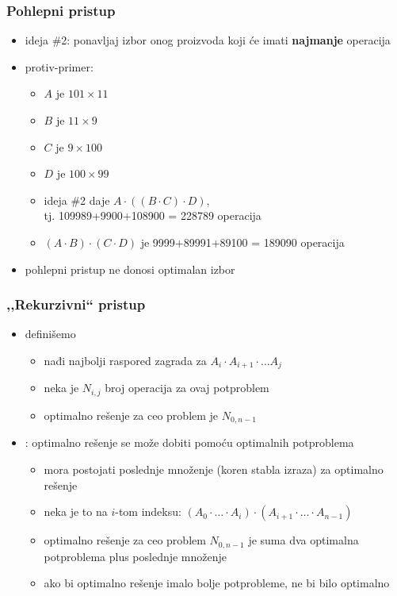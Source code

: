 \documentclass[compress]{beamer}
\begin{document}
\begin{frame}[fragile]
  \frametitle{Pohlepni pristup}
  \begin{itemize}
    \item ideja \#2: ponavljaj izbor onog proizvoda koji će imati \textbf{najmanje} operacija
    \item protiv-primer:
    \begin{itemize}
      \item $A$ je $101\times 11$
      \item $B$ je $11\times 9$
      \item $C$ je $9\times 100$
      \item $D$ je $100\times 99$
      \item ideja \#2 daje $A\cdot ((B\cdot C)\cdot D)$, \\ tj. 109989+9900+108900 = 228789 operacija
      \item $(A\cdot B)\cdot (C\cdot D)$ je 9999+89991+89100 = 189090 operacija
    \end{itemize}
    \item pohlepni pristup ne donosi optimalan izbor
  \end{itemize}
\end{frame}

\begin{frame}[fragile]
  \frametitle{,,Rekurzivni`` pristup}
  \begin{itemize}
    \item definišemo 
    \begin{itemize}
      \item nađi najbolji raspored zagrada za $A_{i}\cdot A_{i+1}\cdot \ldots A_{j}$
      \item neka je $N_{i,j}$ broj operacija za ovaj potproblem
      \item optimalno rešenje za ceo problem je $N_{0,n-1}$
    \end{itemize}
    \item {}: optimalno rešenje se može 
    dobiti pomoću optimalnih potproblema
    \begin{itemize}
      \item mora postojati poslednje množenje (koren stabla izraza) za 
      optimalno rešenje
      \item neka je to na $i$-tom indeksu: $(A_{0}\cdot \ldots \cdot A_{i})\cdot (A_{i+1}\cdot \ldots \cdot A_{n-1})$
      \item optimalno rešenje za ceo problem $N_{0,n-1}$ je suma dva optimalna potproblema plus poslednje množenje
      \item ako bi optimalno rešenje imalo bolje potprobleme, ne bi bilo optimalno
    \end{itemize}
  \end{itemize}
\end{frame}
\end{document}
